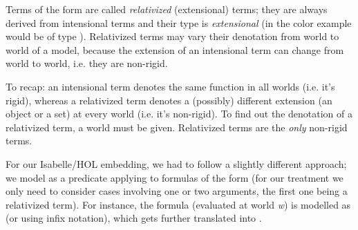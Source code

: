 \begin{isabellebody}
\begin{isamarkuptext}
\end{isamarkuptext}\isamarkuptrue%
%
\begin{isamarkuptext}%
Terms of the form \isa{{\isasymdown}{\isasymalpha}} are called \emph{relativized} (extensional) terms; they are always derived
from intensional terms and their type is \emph{extensional} (in the color example  would be of type \isa{{\isasymlangle}{\isasymzero}{\isasymrangle}}).
Relativized terms may vary their denotation from world to world of a model, because the extension of an intensional term can change
from world to world, i.e. they are non-rigid.%
\end{isamarkuptext}\isamarkuptrue%
%
\begin{isamarkuptext}%
To recap: an intensional term denotes the same function in all worlds (i.e. it's rigid), whereas a relativized term
denotes a (possibly) different extension (an object or a set) at every world (i.e. it's non-rigid). To find out
the denotation of a relativized term, a world must be given. Relativized terms are the \emph{only} non-rigid terms.
\bigbreak%
\end{isamarkuptext}\isamarkuptrue%
%
\begin{isamarkuptext}%
For our Isabelle/HOL embedding, we had to follow a slightly different approach; we model \isa{{\isasymdown}}
as a predicate applying to formulas of the form  (for our treatment
we only need to consider cases involving one or two arguments, the first one being a relativized term).
For instance, the formula  (evaluated at world \emph{w}) is modelled as 
(or  using infix notation), which gets further translated into .


\end{isamarkuptext}
\end{isabellebody}
